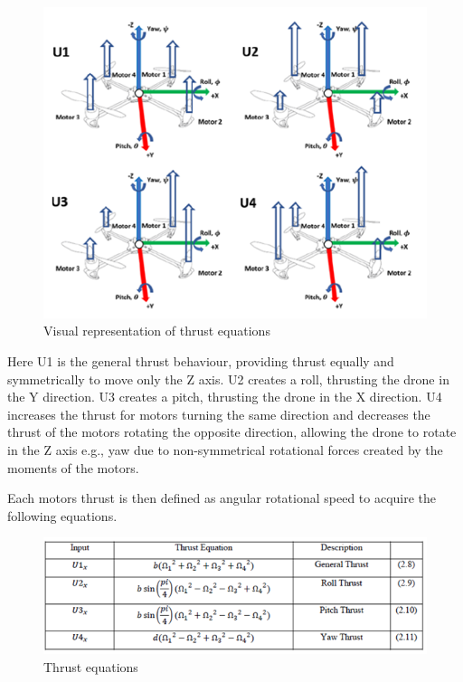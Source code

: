 \begin{figure}[H]
\begin{center}
   \includegraphics[scale =1]{pictures/control/thrust equations results.png}
\end{center}
\caption{Visual representation of thrust equations \cite{Ferry}}
\end{figure}

Here U1 is the general thrust behaviour, providing thrust equally and symmetrically to move only the Z axis. U2 creates a roll, thrusting the drone in the Y direction. U3 creates a pitch, thrusting the drone in the X direction. U4 increases the thrust for motors turning the same direction and decreases the thrust of the motors rotating the opposite direction, allowing the drone to rotate in the Z axis e.g., yaw due to non-symmetrical rotational forces created by the moments of the motors.  \cite{Ferry}

Each motors thrust is then defined as angular rotational speed to acquire the following equations.

\begin{figure}[H]
\begin{center}
   \includegraphics[scale =1]{pictures/control/thrust equations.png}
\end{center}
\caption{Thrust equations \cite{Ferry}}
\end{figure}

